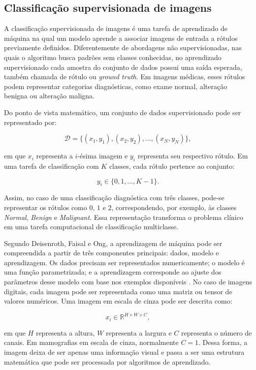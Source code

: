 \documentclass[
    12pt,
    openright,
    oneside,
    a4paper,
    english,
    brazil
]{abntex2}
\begin{document}
\subsection{Classificação supervisionada de imagens}
\label{subsec:classificacao_supervisionada_imagens}

A classificação supervisionada de imagens é uma tarefa de aprendizado de máquina na qual um modelo aprende a associar imagens de entrada a rótulos previamente definidos. Diferentemente de abordagens não supervisionadas, nas quais o algoritmo busca padrões sem classes conhecidas, no aprendizado supervisionado cada amostra do conjunto de dados possui uma saída esperada, também chamada de rótulo ou \textit{ground truth}. Em imagens médicas, esses rótulos podem representar categorias diagnósticas, como exame normal, alteração benigna ou alteração maligna.

Do ponto de vista matemático, um conjunto de dados supervisionado pode ser representado por:

\[
\mathcal{D} =
\{(x_1,y_1),(x_2,y_2),\ldots,(x_N,y_N)\},
\]

em que \(x_i\) representa a \(i\)-ésima imagem e \(y_i\) representa seu respectivo rótulo. Em uma tarefa de classificação com \(K\) classes, cada rótulo pertence ao conjunto:

\[
y_i \in \{0,1,\ldots,K-1\}.
\]

Assim, no caso de uma classificação diagnóstica com três classes, pode-se representar os rótulos como \(0\), \(1\) e \(2\), correspondendo, por exemplo, às classes \textit{Normal}, \textit{Benign} e \textit{Malignant}. Essa representação transforma o problema clínico em uma tarefa computacional de classificação multiclasse.

Segundo Deisenroth, Faisal e Ong, a aprendizagem de máquina pode ser compreendida a partir de três componentes principais: dados, modelo e aprendizagem. Os dados precisam ser representados numericamente; o modelo é uma função parametrizada; e a aprendizagem corresponde ao ajuste dos parâmetros desse modelo com base nos exemplos disponíveis \cite{deisenroth2020mathematics}. No caso de imagens digitais, cada imagem pode ser representada como uma matriz ou tensor de valores numéricos. Uma imagem em escala de cinza pode ser descrita como:

\[
x_i \in \mathbb{R}^{H \times W \times C},
\]

em que \(H\) representa a altura, \(W\) representa a largura e \(C\) representa o número de canais. Em mamografias em escala de cinza, normalmente \(C=1\). Dessa forma, a imagem deixa de ser apenas uma informação visual e passa a ser uma estrutura matemática que pode ser processada por algoritmos de aprendizado.
\end{document}
